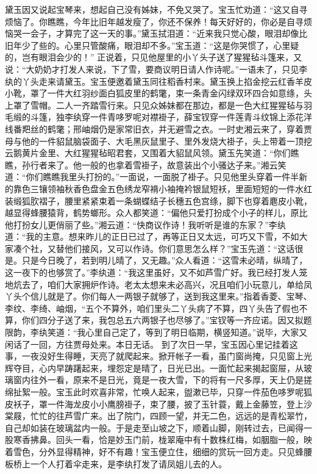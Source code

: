 \documentclass[12pt,oneside]{book}
\begin{document}
黛玉因又说起宝琴来，想起自己没有姊妹，不免又哭了。宝玉忙劝道：“这又自寻烦恼了。你瞧瞧，今年比旧年越发瘦了，你还不保养！每天好好的，你必是自寻烦恼哭一会子，才算完了这一天的事。”黛玉拭泪道：“近来我只觉心酸，眼泪却像比旧年少了些的。心里只管酸痛，眼泪却不多。”宝玉道：“这是你哭惯了，心里疑的，岂有眼泪会少的！”
正说着，只见他屋里的小丫头子送了猩猩毡斗篷来，又说：“大奶奶才打发人来说，下了雪，要商议明日请人作诗呢。”一语未了，只见李纨的丫头走来请黛玉。宝玉便邀着黛玉同往稻香村来。黛玉换上掐金挖云红香羊皮小靴，罩了一件大红羽纱面白狐皮里的鹤氅，束一条青金闪绿双环四合如意绦，头上罩了雪帽。二人一齐踏雪行来。只见众姊妹都在那边，都是一色大红猩猩毡与羽毛缎的斗篷，独李纨穿一件青哆罗呢对襟褂子，薛宝钗穿一件莲青斗纹锦上添花洋线番羓丝的鹤氅；邢岫烟仍是家常旧衣，并无避雪之衣。一时史湘云来了，穿着贾母与他的一件貂鼠脑袋面子、大毛黑灰鼠里子、里外发烧大褂子，头上带着一顶挖云鹅黄片金里、大红猩猩毡昭君套，又围着大貂鼠风领。黛玉先笑道：“你们瞧瞧，孙行者来了。他一般的也拿着雪褂子，故意装出个小骚达子来。”湘云笑道：“你们瞧瞧我里头打扮的。”一面说，一面脱了褂子。只见他里头穿着一件半新的靠色三镶领袖秋香色盘金五色绣龙窄褙小袖掩衿银鼠短袄，里面短短的一件水红装缎狐肷褶子，腰里紧紧束着一条蝴蝶结子长穗五色宫绦，脚下也穿着麀皮小靴，越显得蜂腰猿背，鹤势螂形。众人都笑道：“偏他只爱打扮成个小子的样儿，原比他打扮女儿更俏丽了些。”湘云道：“快商议作诗！我听听是谁的东家？”李纨道：“我的主意。想来昨儿的正日已过了，再等正日又太远，可巧又下雪，不如大家凑个社，又替他们接风，又可以作诗。你们意思怎么样？”宝玉先道：“这话很是。只是今日晚了，若到明儿晴了，又无趣。”众人看道：“这雪未必晴，纵晴了，这一夜下的也够赏了。”李纨道：“我这里虽好，又不如芦雪广好。我已经打发人笼地炕去了，咱们大家拥炉作诗。老太太想来未必高兴，况且咱们小玩意儿，单给凤丫头个信儿就是了。你们每人一两银子就够了，送到我这里来。”指着香菱、宝琴、李纹、李绮、岫烟，“五个不算外，咱们里头二丫头病了不算，四丫头告了假也不算，你们四分子送了来，我包总五六两银子也尽够了。”宝钗等一齐应诺。因又拟题限韵，李纨笑道：“我心里自己定了，等到了明日临期，横竖知道。”说毕，大家又闲话了一回，方往贾母处来。本日无话。
到了次日一早，宝玉因心里记挂着这事，一夜没好生得睡，天亮了就爬起来。掀开帐子一看，虽门窗尚掩，只见窗上光辉夺目，心内早踌躇起来，埋怨定是晴了，日光已出。一面忙起来揭起窗屉，从玻璃窗内往外一看，原来不是日光，竟是一夜大雪，下的将有一尺多厚，天上仍是搓绵扯絮一般。宝玉此时欢喜非常，忙唤人起来，盥漱已毕，只穿一件茄色哆罗呢狐皮袄子，罩一件海龙皮小小鹰膀褂子，束了腰，披了玉针蓑，戴上金藤笠，登上沙棠屐，忙忙的往芦雪广来。出了院门，四顾一望，并无二色，远远的是青松翠竹，自己却如装在玻璃盆内一般。于是走至山坡之下，顺着山脚，刚转过去，已闻得一股寒香拂鼻。回头一看，恰是妙玉门前，栊翠庵中有十数株红梅，如胭脂一般，映着雪色，分外显得精神，好不有趣！宝玉便立住，细细的赏玩一回方走。只见蜂腰板桥上一个人打着伞走来，是李纨打发了请凤姐儿去的人。
\end{document}

